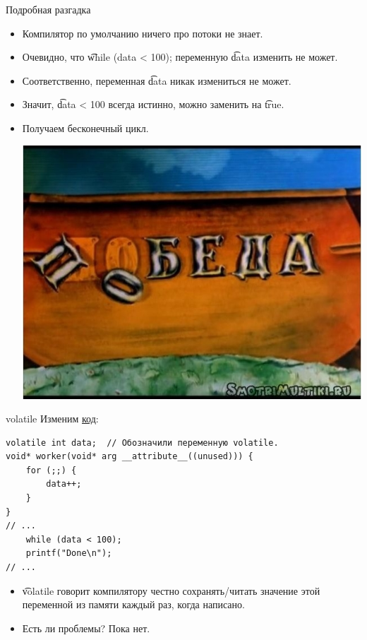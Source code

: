 \begin{frame}{Подробная разгадка}
	\begin{itemize}
		\item Компилятор по умолчанию ничего про потоки не знает.
		\item Очевидно, что \t{while (data < 100);} переменную \t{data} изменить не может.
		\item Соответственно, переменная \t{data} никак измениться не может.
		\item Значит, \t{data < 100} всегда истинно, можно заменить на \t{true}.
		\item Получаем бесконечный цикл.
			\begin{center}
				\includegraphics[scale=0.3]{win-lose.jpg}
			\end{center}
	\end{itemize}
\end{frame}

\begin{frame}[fragile]{volatile}
	Изменим \href{https://github.com/yeputons/fall-2016-paradigms/raw/master/161019/sources/13-volatile.c}{код}:
\begin{verbatim}
volatile int data;  // Обозначили переменную volatile.
void* worker(void* arg __attribute__((unused))) {
    for (;;) {
        data++;
    }
}
// ...
    while (data < 100);
    printf("Done\n");
// ...
\end{verbatim}
	\begin{itemize}
		\item \t{volatile} говорит компилятору честно сохранять/читать значение этой переменной из памяти каждый раз, когда написано.
		\item Есть ли проблемы? \pause Пока нет.
	\end{itemize}
\end{frame}

